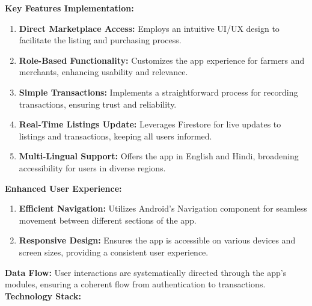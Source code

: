 \documentclass{article}
\begin{document}
\textbf{Key Features Implementation:}

\begin{enumerate}
    \item \textbf{Direct Marketplace Access:} Employs an intuitive UI/UX design to facilitate the listing and purchasing process.
    \item \textbf{Role-Based Functionality:} Customizes the app experience for farmers and merchants, enhancing usability and relevance.
    \item \textbf{Simple Transactions:} Implements a straightforward process for recording transactions, ensuring trust and reliability.
    \item \textbf{Real-Time Listings Update:} Leverages Firestore for live updates to listings and transactions, keeping all users informed.
    \item \textbf{Multi-Lingual Support:} Offers the app in English and Hindi, broadening accessibility for users in diverse regions.
\end{enumerate}

\textbf{Enhanced User Experience:}

\begin{enumerate}
    \item \textbf{Efficient Navigation:} Utilizes Android's Navigation component for seamless movement between different sections of the app.
    \item \textbf{Responsive Design:} Ensures the app is accessible on various devices and screen sizes, providing a consistent user experience.
\end{enumerate}

\textbf{Data Flow:} 
User interactions are systematically directed through the app's modules, ensuring a coherent flow from authentication to transactions.\\

\textbf{Technology Stack:}
\end{document}
